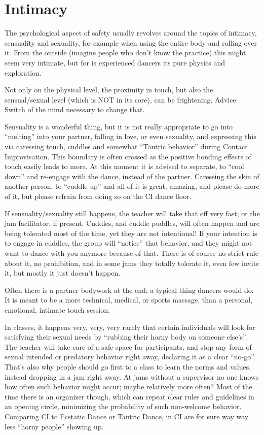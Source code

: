 \section{Intimacy}\label{sec:intimacy}

The psychological aspect of safety usually revolves around the topics of intimacy, sensuality and sexuality,
for example when using the entire body and rolling over it.
From the outside (imagine people who don't know the practice) this might seem very intimate, but for is experienced dancers its pure physics and exploration.

Not only on the physical level, the proximity in touch, but also the sensual/sexual level (which is NOT in its core), can be frightening.
Advice: Switch of the mind necessary to change that.

Sensuality is a wonderful thing, but it is not really appropriate to go into ``melting'' into your partner, falling in love, or even sexuality, and expressing this via caressing touch, cuddles and somewhat ``Tantric behavior'' during Contact Improvisation.
This boundary is often crossed as the positive bonding effects of touch easily leads to more.
At this moment it is advised to separate, to ``cool down'' and re-engage with the dance, instead of the partner.
Caressing the skin of another person, to ``cuddle up'' and all of it is great, amazing, and please do more of it, but please refrain from doing so on the CI dance floor.

If sensuality/sexuality still happens, the teacher will take that off very fast; or the jam facilitator, if present.
Cuddles, and cuddle puddles, will often happen and are being tolerated most of the time, yet they are not intentional!
If your intention is to engage in cuddles, the group will ``notice'' that behavior, and they might not want to dance with you anymore because of that.
There is of course no strict rule about it, no prohibition, and in some jams they totally tolerate it, even few invite it, but mostly it just doesn't happen.

Often there is a partner bodywork at the end; a typical thing dancers would do.
It is meant to be a more technical, medical, or sports massage, than a personal, emotional, intimate touch session.

In classes, it happens very, very, very rarely that certain individuals will look for satisfying their sexual needs by ``rubbing their horny body on someone else's''.
The teacher will take care of a safe space for participants, and stop any form of sexual intended or predatory behavior right away, declaring it as a clear ``no-go''.
That's also why people should go first to a class to learn the norms and values, instead dropping in a jam right away.
At jams without a supervisor no one knows how often such behavior might occur; maybe relatively more often?
Most of the time there is an organizer though, which can repeat clear rules and guidelines in an opening circle, minimizing the probability of such non-welcome behavior.
Comparing CI to Ecstatic Dance or Tantric Dance, in CI are for sure way way less ``horny people'' showing up.

